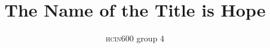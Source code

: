 \documentclass[sigconf]{acmart}
\begin{document}
\title{The Name of the Title is Hope}

\author{\textsc{hcin}600 group 4}






\renewcommand{\shortauthors}{Group 4}

\begin{abstract}
\end{abstract}

\end{document}
